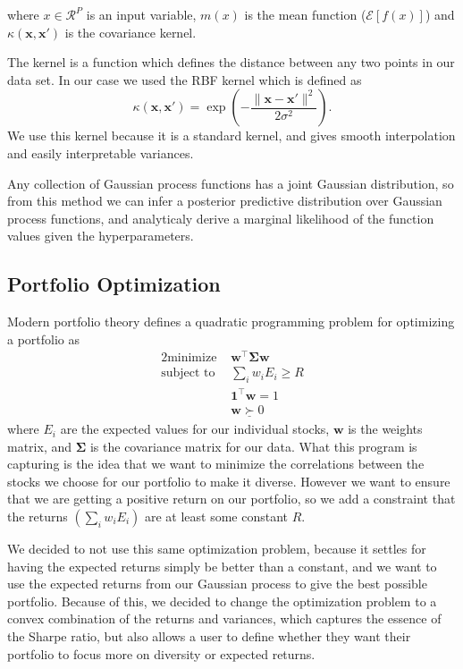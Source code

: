 \documentclass{article}
\begin{document}
where $x \in \mathcal{R}^P$ is an input variable, $m(x)$ is the mean function ($\mathcal{E}[f(x)]$) and $\kappa (\textbf{x}, \textbf{x}')$ is the covariance kernel.  

The kernel is a function which defines the distance between any two points in our data set. In our case we used the RBF kernel which is defined as
\begin{equation}
	\kappa (\textbf{x}, \textbf{x}') = \exp \left( - \frac{\|\textbf{x} - \textbf{x}' \|^2}{2\sigma^2} \right).
    \label{eqn:RBF}
\end{equation}
We use this kernel because it is a standard kernel, and gives smooth interpolation and easily interpretable variances. 

Any collection of Gaussian process functions has a joint Gaussian distribution, so from this method we can infer a posterior predictive distribution over Gaussian process functions, and analyticaly derive a marginal likelihood of the function values given the hyperparameters. \cite{spectral}


\subsection{Portfolio Optimization}

Modern portfolio theory defines a quadratic programming problem for optimizing a portfolio as
\begin{alignat*}{2}
    \text{minimize }   &   \textbf{w}^\top \mathbf{\Sigma} \textbf{w}\\
    \text{subject to } & \sum_i w_i E_i \geq R \\
    & \textbf{1}^\top \textbf{w} = 1 \\
    & \textbf{w} \underline{\succ} 0
\end{alignat*}
where $E_i$ are the expected values for our individual stocks, $\textbf{w}$ is the weights matrix, and $\mathbf{\Sigma}$ is the covariance matrix for our data. What this program is capturing is the idea that we want to minimize the correlations between the stocks we choose for our portfolio to make it diverse.  However we want to ensure that we are getting a positive return on our portfolio, so we add a constraint that the returns $\left(\sum_i w_i E_i \right)$ are at least some constant $R$.  

We decided to not use this same optimization problem, because it settles for having the expected returns simply be better than a constant, and we want to use the expected returns from our Gaussian process to give the best possible portfolio.  Because of this, we decided to change the optimization problem to a convex combination of the returns and variances, which captures the essence of the Sharpe ratio, but also allows a user to define whether they want their portfolio to focus more on diversity or expected returns.  
\end{document}
